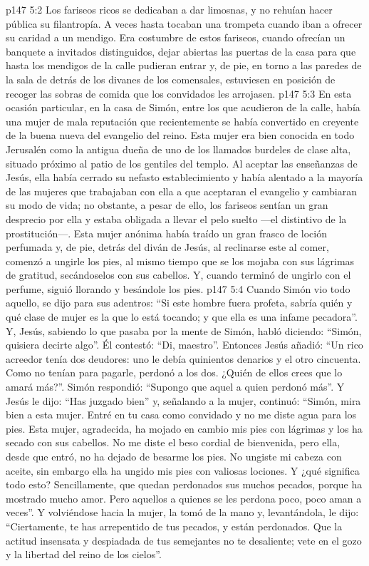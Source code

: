 \vs p147 5:2 Los fariseos ricos se dedicaban a dar limosnas, y no rehuían hacer pública su filantropía. A veces hasta tocaban una trompeta cuando iban a ofrecer su caridad a un mendigo. Era costumbre de estos fariseos, cuando ofrecían un banquete a invitados distinguidos, dejar abiertas las puertas de la casa para que hasta los mendigos de la calle pudieran entrar y, de pie, en torno a las paredes de la sala de detrás de los divanes de los comensales, estuviesen en posición de recoger las sobras de comida que los convidados les arrojasen.
\vs p147 5:3 En esta ocasión particular, en la casa de Simón, entre los que acudieron de la calle, había una mujer de mala reputación que recientemente se había convertido en creyente de la buena nueva del evangelio del reino. Esta mujer era bien conocida en todo Jerusalén como la antigua dueña de uno de los llamados burdeles de clase alta, situado próximo al patio de los gentiles del templo. Al aceptar las enseñanzas de Jesús, ella había cerrado su nefasto establecimiento y había alentado a la mayoría de las mujeres que trabajaban con ella a que aceptaran el evangelio y cambiaran su modo de vida; no obstante, a pesar de ello, los fariseos sentían un gran desprecio por ella y estaba obligada a llevar el pelo suelto ---el distintivo de la prostitución---. Esta mujer anónima había traído un gran frasco de loción perfumada y, de pie, detrás del diván de Jesús, al reclinarse este al comer, comenzó a ungirle los pies, al mismo tiempo que se los mojaba con sus lágrimas de gratitud, secándoselos con sus cabellos. Y, cuando terminó de ungirlo con el perfume, siguió llorando y besándole los pies.
\vs p147 5:4 Cuando Simón vio todo aquello, se dijo para sus adentros: “Si este hombre fuera profeta, sabría quién y qué clase de mujer es la que lo está tocando; y que ella es una infame pecadora”. Y, Jesús, sabiendo lo que pasaba por la mente de Simón, habló diciendo: “Simón, quisiera decirte algo”. Él contestó: “Di, maestro”. Entonces Jesús añadió: “Un rico acreedor tenía dos deudores: uno le debía quinientos denarios y el otro cincuenta. Como no tenían para pagarle, perdonó a los dos. ¿Quién de ellos crees que lo amará más?”. Simón respondió: “Supongo que aquel a quien perdonó más”. Y Jesús le dijo: “Has juzgado bien” y, señalando a la mujer, continuó: “Simón, mira bien a esta mujer. Entré en tu casa como convidado y no me diste agua para los pies. Esta mujer, agradecida, ha mojado en cambio mis pies con lágrimas y los ha secado con sus cabellos. No me diste el beso cordial de bienvenida, pero ella, desde que entró, no ha dejado de besarme los pies. No ungiste mi cabeza con aceite, sin embargo ella ha ungido mis pies con valiosas lociones. Y ¿qué significa todo esto? Sencillamente, que quedan perdonados sus muchos pecados, porque ha mostrado mucho amor. Pero aquellos a quienes se les perdona poco, poco aman a veces”. Y volviéndose hacia la mujer, la tomó de la mano y, levantándola, le dijo: “Ciertamente, te has arrepentido de tus pecados, y están perdonados. Que la actitud insensata y despiadada de tus semejantes no te desaliente; vete en el gozo y la libertad del reino de los cielos”.
